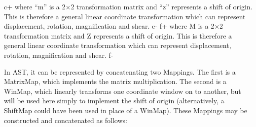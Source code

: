 \documentclass[twoside,11pt]{article}
\begin{document}
c+
where ``m'' is a 2$\times$2 transformation matrix and ``z'' represents
a shift of origin. This is therefore a general linear coordinate
transformation which can represent displacement, rotation,
magnification and shear.
c-
f+
where M is a 2$\times$2 transformation matrix and Z represents a shift
of origin. This is therefore a general linear coordinate
transformation which can represent displacement, rotation,
magnification and shear.
f-

In AST, it can be represented by concatenating two Mappings. The first
is a MatrixMap, which implements the matrix multiplication. The second
is a WinMap, which linearly transforms one coordinate window on to
another, but will be used here simply to implement the shift of
origin (alternatively, a ShiftMap could have been used in place of a
WinMap). These Mappings may be constructed and concatenated as follows:
\end{document}
